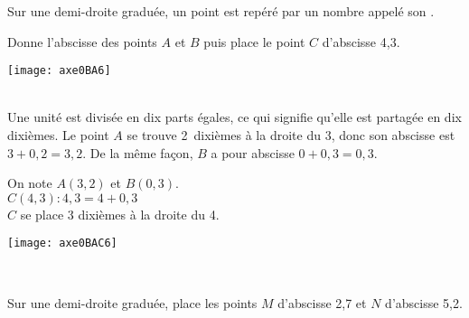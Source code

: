 \begin{methode*1}

\begin{aconnaitre}
Sur une demi-droite graduée, un point est repéré par un nombre appelé son \textbf{}.
\end{aconnaitre}

\begin{exemple*1}

\vspace{0.5cm}

 \begin{minipage}[c]{.46\textwidth}
 Donne l'abscisse des points $A$ et $B$ puis place le point $C$ d'abscisse 4,3.
  \end{minipage}\hfill%
 \begin{minipage}[c]{.46\textwidth} 
\texttt{[image: axe0BA6]}
 \end{minipage}\\

Une unité est divisée en dix parts égales, ce qui signifie qu'elle est partagée en dix dixièmes. Le point $A$ se trouve 2 dixièmes à la droite du 3, donc son abscisse est $3 + 0,2 = 3,2$. De la même façon, $B$ a pour abscisse $0 + 0,3 = 0,3$. \\

  \begin{minipage}[c]{.46\textwidth}
On note $A(3,2)$ et $B(0,3)$.\\
$C(4,3) : 4,3 = 4 + 0,3$\\
$C$ se place 3 dixièmes à la droite du 4.
  \end{minipage}\hfill%
 \begin{minipage}[c]{.46\textwidth} 
\texttt{[image: axe0BAC6]}
 \end{minipage}\\

\end{exemple*1}

\exercice 

Sur une demi-droite graduée, place les points $M$ d'abscisse 2,7 et $N$ d'abscisse 5,2.

\end{methode*1}

